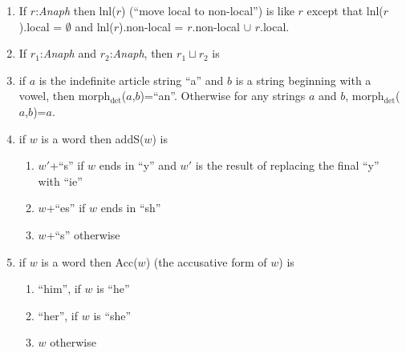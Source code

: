 \begin{enumerate}
\item If $r$:\textit{Anaph} then lnl($r$) (``move local to
  non-local'') is like $r$
  except that lnl($r$).local = $\emptyset$ and
  lnl($r$).non-local = $r$.non-local $\cup$ $r$.local. 

\item If $r_1$:\textit{Anaph} and $r_2$:\textit{Anaph}, then
  $r_1\sqcup r_2$ is
\begin{display}
\end{display}

 
\item if $a$ is the indefinite article string ``a'' and $b$ is a string
  beginning with a vowel, then
  morph$_{\mathrm{det}}$($a$,$b$)=``an''. Otherwise for any strings
  $a$ and $b$, morph$_{\mathrm{det}}$($a$,$b$)=$a$.

\item if $w$ is a word then addS($w$) is 
\begin{enumerate} 
 
\item $w'$+``s'' if $w$ ends in ``y'' and $w'$ is the result of
  replacing the final ``y'' with ``ie''
 
\item $w$+``es'' if $w$ ends in ``sh''

\item $w$+``s'' otherwise
 
\end{enumerate} 

\item if $w$ is a word then Acc($w$) (the accusative form of $w$) is
\begin{enumerate} 
 
\item ``him'', if $w$ is ``he'' 
 
\item ``her'', if $w$ is ``she'' 

\item  $w$ otherwise

\end{enumerate} 
  
  
 
\end{enumerate} 
  
